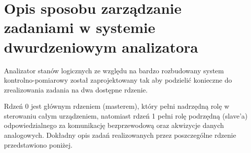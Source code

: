 \section{Opis sposobu zarządzanie zadaniami w systemie dwurdzeniowym analizatora}

Analizator stanów logicznych ze względu na bardzo rozbudowany system kontrolno-pomiarowy
został zaprojektowany tak aby podzielić konieczne do zrealizowania zadania na dwa dostępne rdzenie.

Rdzeń 0 jest głównym rdzeniem (masterem), który pełni nadrzędną rolę w sterowaniu całym urządzeniem,
natomiast rdzeń 1 pełni rolę podrzędną (slave'a) odpowiedzialnego za komunikację bezprzewodową oraz akwizycje danych analogowych.
Dokładny opis zadań realizowanych przez poszczególne rdzenie przedstawiono poniżej.

